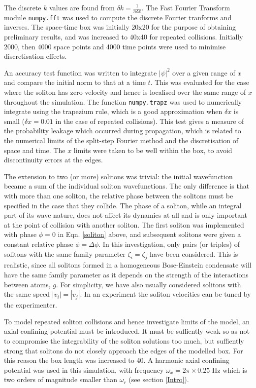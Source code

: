 \documentclass[10pt, twocolumn]{revtex4}    %
\begin{document}
The discrete $k$ values are found from $\delta k = \frac{1}{n \delta x}$. The Fast Fourier Transform module \texttt{numpy.fft} was used to compute the discrete Fourier tranforms and inverses. The space-time box was initially 20x20 for the purpose of obtaining preliminary results, and was increased to 40x40 for repeated collisions. Initially 2000, then 4000 space points and 4000 time points were used to minimise discretisation effects. 

An accuracy test function was written to integrate $|\psi|^2$ over a given range of $x$ and compare the initial norm to that at a time $t$. This was evaluated for the case where the soliton has zero velocity and hence is localised over the same range of $x$ throughout the simulation. The function \texttt{numpy.trapz} was used to numerically integrate using the trapezium rule, which is a good approximation when $\delta x$ is small ($\delta x = 0.01$ in the case of repeated collisions). This test gives a measure of the probability leakage which occurred during propagation, which is related to the numerical limits of the split-step Fourier method and the discretisation of space and time. The $x$ limits were taken to be well within the box, to avoid discontinuity errors at the edges. 

The extension to two (or more) solitons was trivial: the initial wavefunction became a sum of the individual soliton wavefunctions. The only difference is that with more than one soliton, the relative phase between the solitons must be specified in the case that they collide. The phase of a soliton, while an integral part of its wave nature, does not affect its dynamics at all and is only important at the point of collision with another soliton. The first soliton was implemented with phase $\phi = 0$ in Eqn. \ref{soliton} above, and subsequent solitons were given a constant relative phase $\phi=\Delta \phi$. In this investigation, only pairs (or triples) of solitons with the same family parameter $\zeta_i=\zeta_j$ have been considered. This is realistic, since all solitons formed in a homogeneous Bose-Einstein condensate will have the same family parameter as it depends on the strength of the interactions between atoms, $g$. For simplicity, we have also usually considered solitons with the same speed $|v_i| = |v_j|$. In an experiment the soliton velocities can be tuned by the experimenter. 

To model repeated soliton collisions and hence investigate limits of the model, an axial confining potential must be introduced. It must be suffiently weak so as not to compromise the integrability of the soliton solutions too much, but suffiently strong that solitons do not closely approach the edges of the modelled box. For this reason the box length was increased to 40. A harmonic axial confining potential was used in this simulation, with frequency  $\omega_x = 2\pi \times 0.25$ Hz which is two orders of magnitude smaller than $\omega_r$ (see section \ref{Intro}). 
\end{document}
